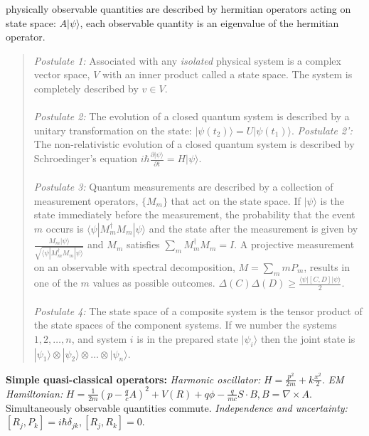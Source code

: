 physically observable quantities are described by hermitian operators acting on state space:
$A | \psi \rangle $, each observable quantity is an eigenvalue of the hermitian operator. 
\begin{quote}
\emph{Postulate 1:} Associated with any \emph {isolated}  physical system is a complex
vector space, $V$ with an inner product called a state space.  The system is completely
described by $v \in V$.
\\
\\
\emph{Postulate 2:} The evolution of a closed quantum system is described by a unitary
transformation on the state: $|\psi(t_2) \rangle  = U |\psi(t_1) \rangle $.
\emph{Postulate 2':} 
The non-relativistic evolution of a closed quantum system is described by Schroedinger's
equation $i \hbar {\frac {\partial |\psi \rangle } {\partial t}}= H |\psi \rangle $.
\\
\\
\emph{Postulate 3:} Quantum measurements are described by a collection of 
measurement operators,
$\{ M_m \}$ that act on the state space.  If $|\psi \rangle $
is the state immediately before the measurement, the probability that the event $m$ occurs
is 
$ \langle \psi | M_m^{\dagger} M_m | \psi \rangle $ 
and the state after the measurement is given by
${\frac {M_m |\psi \rangle } {\sqrt { \langle \psi | M_m^{\dagger} M_m | \psi \rangle }}}$ and $M_m$ satisfies
$\sum_m M_m^{\dagger}M_m = I$.  A projective measurement on an observable
with spectral decomposition, $M= \sum_m mP_m$, results in one of the $m$ values as possible
outcomes.  $\Delta(C) \Delta(D) \ge {\frac { \langle \psi|[C,D]|\psi \rangle } {2}}$.
\\
\\
\emph{Postulate 4:} The state space of a composite system is the tensor
product of the state spaces of the component systems.  If we number the systems
$1, 2, \ldots, n$, and system $i$ is in the prepared state $|\psi_i \rangle $ then the joint state
is $|\psi_1 \rangle  \otimes |\psi_2 \rangle  \otimes \ldots \otimes |\psi_n \rangle $.
\end{quote}
{\bf Simple quasi-classical operators:}
\emph{Harmonic oscillator:}
$H= {\frac {p^2} {2m}} + k {\frac {x^2} 2}$.  \emph{EM Hamiltonian:}
$H= {\frac 1 {2m}} (p- {\frac q c} A)^2 + V(R)+ q \phi - {\frac q {mc}} S \cdot B,
B= \nabla \times A$.
Simultaneously observable quantities commute.  \emph{Independence and uncertainty:}
$[R_j, P_k]= i \hbar \delta_{jk}, [R_j, R_k]=0$.
\\
\\
